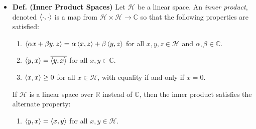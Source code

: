 \documentclass{article}
\begin{document}
\begin{itemize}
	\item \textbf{Def. (Inner Product Spaces)} Let $\mathscr{H}$ be a linear space. An \textit{inner product}, denoted $\braket{\cdot,\cdot}$ is a map from $\mathscr{H} \times \mathscr{H} \to \mathbb{C}$ so that the following properties are satisfied:
	\begin{enumerate}[itemsep =-2pt,label = (\roman{*})]
		\item $\braket{\alpha x + \beta y, z} = \alpha \braket{x, z} + \beta \braket{y, z}$ for all $x,y, z \in \mathscr{H}$ and $\alpha,\beta \in \mathbb{C}$. 
		\item $\braket{y, x} = \overline{\braket{y, x}}$ for all $x, y \in \mathbb{C}$. 
		\item $\braket{x,x} \geq 0$ for all $x \in \mathscr{H}$, with equality if and only if $x = 0$. 
	\end{enumerate}
	If $\mathscr{H}$ is a linear space over $\mathbb{R}$ instead of $\mathbb{C}$, then the inner product satisfies the alternate property: 
	\begin{enumerate}
		\item[(ii')] $\braket{y,x} = \braket{x,y}$ for all $x, y \in \mathscr{H}$. 
	\end{enumerate}
	

\end{itemize}
\end{document}
